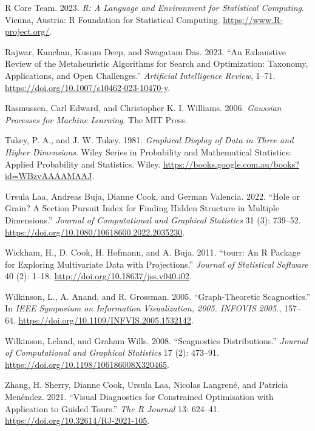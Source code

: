 \documentclass[
  12pt,
]{interact}
\newlength{\cslhangindent}
\newlength{\cslentryspacingunit} %
\newenvironment{CSLReferences}[2] %
 {%
  \setlength{\parindent}{0pt}
  \ifodd #1
  \let\oldpar\par
  \def\par{\hangindent=\cslhangindent\oldpar}
  \fi
  \setlength{\parskip}{#2\cslentryspacingunit}
 }%
 {}
\theoremstyle{plain}
\begin{document}
\begin{CSLReferences}{1}{0}
\leavevmode{}%
R Core Team. 2023. \emph{R: A Language and Environment for Statistical
Computing}. Vienna, Austria: R Foundation for Statistical Computing.
\url{https://www.R-project.org/}.

\leavevmode{}%
Rajwar, Kanchan, Kusum Deep, and Swagatam Das. 2023. {``An Exhaustive
Review of the Metaheuristic Algorithms for Search and Optimization:
Taxonomy, Applications, and Open Challenges.''} \emph{Artificial
Intelligence Review}, 1--71.
\url{https://doi.org/10.1007/s10462-023-10470-y}.

\leavevmode{}%
Rasmussen, Carl Edward, and Christopher K. I. Williams. 2006.
\emph{Gaussian Processes for Machine Learning}. The MIT Press.

\leavevmode{}%
Tukey, P. A., and J. W. Tukey. 1981. \emph{Graphical Display of Data in
Three and Higher Dimensions}. Wiley Series in Probability and
Mathematical Statistics: Applied Probability and Statistics. Wiley.
\url{https://books.google.com.au/books?id=WBzvAAAAMAAJ}.

\leavevmode{}%
Ursula Laa, Andreas Buja, Dianne Cook, and German Valencia. 2022.
{``Hole or Grain? A Section Pursuit Index for Finding Hidden Structure
in Multiple Dimensions.''} \emph{Journal of Computational and Graphical
Statistics} 31 (3): 739--52.
\url{https://doi.org/10.1080/10618600.2022.2035230}.

\leavevmode{}%
Wickham, H., D. Cook, H. Hofmann, and A. Buja. 2011. {``{tourr}: An {R}
Package for Exploring Multivariate Data with Projections.''}
\emph{Journal of Statistical Software} 40 (2): 1--18.
\url{http://doi.org/10.18637/jss.v040.i02}.

\leavevmode{}%
Wilkinson, L., A. Anand, and R. Grossman. 2005. {``Graph-Theoretic
Scagnostics.''} In \emph{IEEE Symposium on Information Visualization,
2005. INFOVIS 2005.}, 157--64.
\url{https://doi.org/10.1109/INFVIS.2005.1532142}.

\leavevmode{}%
Wilkinson, Leland, and Graham Wills. 2008. {``Scagnostics
Distributions.''} \emph{Journal of Computational and Graphical
Statistics} 17 (2): 473--91.
\url{https://doi.org/10.1198/106186008X320465}.

\leavevmode{}%
Zhang, H. Sherry, Dianne Cook, Ursula Laa, Nicolas Langrené, and
Patricia Menéndez. 2021. {``Visual Diagnostics for Constrained
Optimisation with Application to Guided Tours.''} \emph{The R Journal}
13: 624--41. \url{https://doi.org/10.32614/RJ-2021-105}.

\end{CSLReferences}
\end{document}
